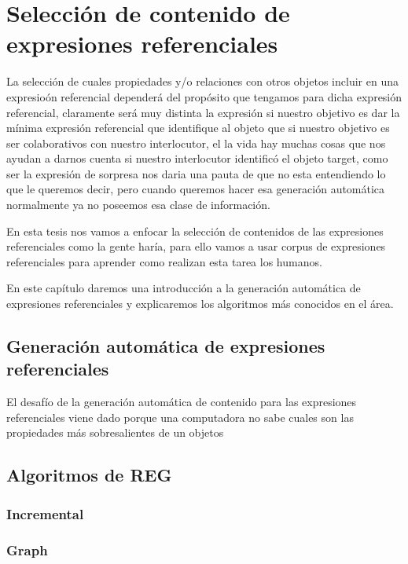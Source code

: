 \chapter{Selecci\'on de contenido de expresiones referenciales}
\label{sec:seleccion}

La selecci\'on de cuales propiedades y/o relaciones con otros objetos incluir en una expresio\'on referencial depender\'a del prop\'osito que tengamos para dicha expresi\'on referencial, claramente ser\'a muy distinta la expresi\'on si nuestro objetivo es dar la m\'inima expresi\'on referencial que identifique al objeto que si nuestro objetivo es ser colaborativos con nuestro interlocutor, el la vida hay muchas cosas que nos ayudan a darnos cuenta si nuestro interlocutor identific\'o el objeto target, como ser la expresi\'on de sorpresa nos daria una pauta de que no esta entendiendo lo que le queremos decir, pero cuando queremos hacer esa generaci\'on autom\'atica normalmente ya no poseemos esa clase de informaci\'on.

En esta tesis nos vamos a enfocar la selecci\'on de contenidos de las expresiones referenciales como la gente har\'ia, para ello vamos a usar corpus de expresiones referenciales para aprender como realizan esta tarea los humanos.

En este cap\'itulo daremos una introducci\'on a la generaci\'on autom\'atica de expresiones referenciales y explicaremos los algoritmos m\'as conocidos en el \'area.

\section{Generaci\'on autom\'atica de expresiones referenciales}

El desaf\'io de la generaci\'on autom\'atica de contenido para las expresiones referenciales viene dado porque una computadora no sabe cuales son las propiedades m\'as sobresalientes de un objetos

\section{Algoritmos de REG}

\subsection{Incremental}
\subsection{Graph}
